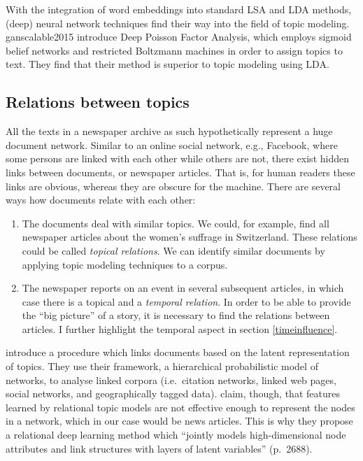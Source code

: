 With the integration of word embeddings into standard LSA and LDA methods, (deep) neural network techniques find their way into the field of topic modeling. ganscalable2015 introduce Deep Poisson Factor Analysis, which employs sigmoid belief networks and restricted Boltzmann machines in order to assign topics to text. They find that their method is superior to topic modeling using LDA.

\subsection{Relations between topics}
All the texts in a newspaper archive as such hypothetically represent a huge document network. Similar to an online social network, e.g., Facebook, where some persons are linked with each other while others are not, there exist hidden links between documents, or newspaper articles. That is, for human readers these links are obvious, whereas they are obscure for the machine. There are several ways how documents relate with each other:
\begin{enumerate}
	\item The documents deal with similar topics. We could, for example, find all newspaper articles about the women's suffrage in Switzerland. These relations could be called \textit{topical relations}. We can identify similar documents by applying topic modeling techniques to a corpus. 
	\item The newspaper reports on an event in several subsequent articles, in which case there is a topical and a \textit{temporal relation}. In order to be able to provide the ``big picture'' of a story, it is necessary to find the relations between articles. I further highlight the temporal aspect in  section \ref{timeinfluence}.
\end{enumerate}

\citet{changhierarchical2010} introduce a procedure which links documents based on the latent representation of topics. They use their framework, a hierarchical probabilistic model of networks, to analyse linked corpora (i.e.~citation networks, linked web pages, social networks, and geographically tagged data). \citet{wangrelational2017} claim, though, that features learned by relational topic models are not effective enough to represent the nodes in a network, which in our case would be news articles. This is why they propose a relational deep learning method which ``jointly models high-dimensional node attributes and link structures with layers of latent variables'' (p.~2688).

